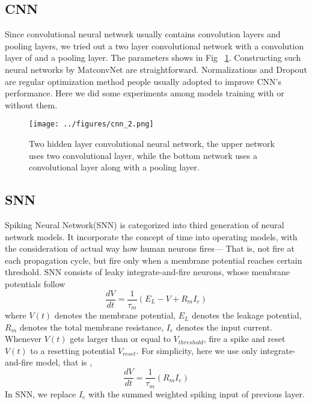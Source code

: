 \documentclass[10pt,twocolumn,letterpaper]{article}
\begin{document}
\subsection{CNN}
Since convolutional neural network usually contains convolution layers and pooling layers, we tried out a two layer convolutional network with a convolution layer of and a pooling layer. The parameters shows in Fig ~\ref{fig:cnn}. Constructing such neural networks by MatconvNet are straightforward. Normalizations and Dropout are regular optimization method people usually adopted to improve CNN's performance. Here we did some experiments among  models training with or without them.
\begin{figure}[t]
\begin{center}
   \texttt{[image: ../figures/cnn\_2.png]}
\end{center}
   \caption{Two hidden layer convolutional neural network,  the upper network uses two convolutional layer, while the bottom network uses a convolutional layer along with a pooling layer. }
\label{fig:cnn}
\end{figure}

\subsection{SNN}
Spiking Neural Network(SNN) is categorized into third generation of neural network models. It incorporate the concept of time into operating models, with the consideration of actual way how human neurons fires--- That is, not fire at each propagation cycle, but fire only when a membrane potential reaches certain threshold. SNN consists of  leaky integrate-and-fire neurons, whose membrane potentials follow
\begin{equation}
\frac{dV}{dt} = \frac{1}{\tau_m}(E_L - V + R_m I_e)
\end{equation}
where $V(t)$ denotes the membrane potential, $E_L$ denotes the leakage potential, $R_m$ denotes the total membrane resistance, $I_e$ denotes the input current. Whenever $V(t)$ gets larger than or equal to $V_{threshold}$, fire a spike and reset $V(t)$ to a resetting potential $V_{reset}$. For simplicity, here we use only integrate-and-fire model, that is , 
\begin{equation}
\frac{dV}{dt} = \frac{1}{\tau_m}(R_m I_e)
\end{equation}
In SNN, we replace $I_e$ with the summed weighted spiking input of previous layer. 
\end{document}

